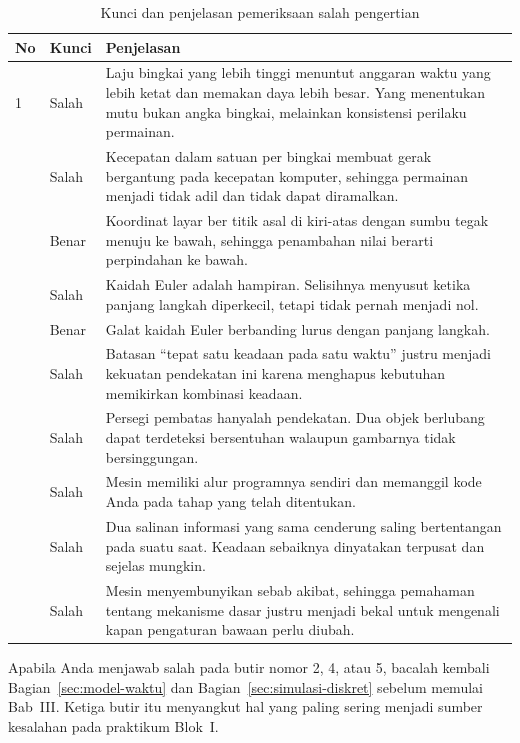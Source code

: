 \begin{table}[htbp]
\centering
\caption{Kunci dan penjelasan pemeriksaan salah pengertian}
\label{tab:kunci-miskonsepsi}
{\setlength{\tabcolsep}{4pt}\footnotesize%
\begin{tabularx}{\textwidth}{@{}C{0.8cm} C{1.2cm} Y@{}}
\toprule
\headrow \textbf{No} & \textbf{Kunci} & \textbf{Penjelasan} \\
 & Salah &
Laju bingkai yang lebih tinggi menuntut anggaran waktu yang lebih ketat dan
memakan daya lebih besar. Yang menentukan mutu bukan angka bingkai, melainkan
konsistensi perilaku permainan. \\
 & Salah &
Kecepatan dalam satuan per bingkai membuat gerak bergantung pada kecepatan
komputer, sehingga permainan menjadi tidak adil dan tidak dapat diramalkan. \\
 & Benar &
Koordinat layar ber titik asal di kiri-atas dengan sumbu tegak menuju ke bawah,
sehingga penambahan nilai berarti perpindahan ke bawah. \\
 & Salah &
Kaidah Euler adalah hampiran. Selisihnya menyusut ketika panjang langkah
diperkecil, tetapi tidak pernah menjadi nol. \\
 & Benar &
Galat kaidah Euler berbanding lurus dengan panjang langkah. \\
 & Salah &
Batasan ``tepat satu keadaan pada satu waktu'' justru menjadi kekuatan
pendekatan ini karena menghapus kebutuhan memikirkan kombinasi keadaan. \\
 & Salah &
Persegi pembatas hanyalah pendekatan. Dua objek berlubang dapat terdeteksi
bersentuhan walaupun gambarnya tidak bersinggungan. \\
 & Salah &
Mesin memiliki alur programnya sendiri dan memanggil kode Anda pada tahap yang
telah ditentukan. \\
 & Salah &
Dua salinan informasi yang sama cenderung saling bertentangan pada suatu saat.
Keadaan sebaiknya dinyatakan terpusat dan sejelas mungkin. \\
 & Salah &
Mesin menyembunyikan sebab akibat, sehingga pemahaman tentang mekanisme dasar
justru menjadi bekal untuk mengenali kapan pengaturan bawaan perlu diubah. \\
\bottomrule
\end{tabularx}}
\end{table}

\begin{catatabox}
Apabila Anda menjawab salah pada butir nomor 2, 4, atau 5, bacalah kembali
Bagian~\ref{sec:model-waktu} dan Bagian~\ref{sec:simulasi-diskret} sebelum
memulai Bab~III. Ketiga butir itu menyangkut hal yang paling sering menjadi
sumber kesalahan pada praktikum Blok~I.
\end{catatabox}
